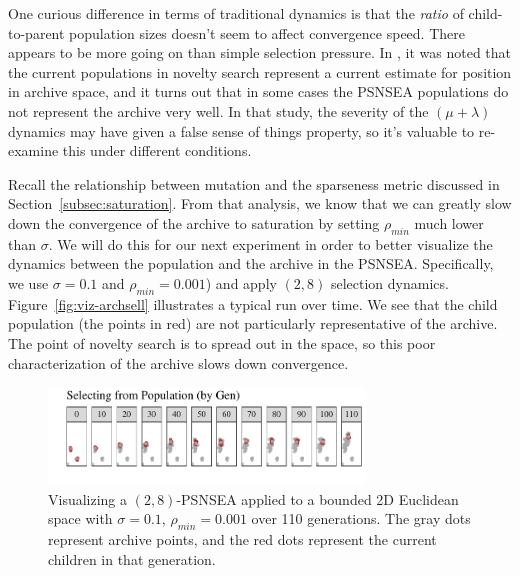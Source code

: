 \documentclass[twoside]{article}
\begin{document}
One curious difference in terms of traditional dynamics is that the \emph{ratio} of child-to-parent population sizes doesn't seem to affect convergence speed.  There appears to be more going on than simple selection pressure.  In \citet{Wiegand2021flairs}, it was noted that the current populations in novelty search represent a current estimate for position in archive space, and it turns out that in some cases the PSNSEA populations do not represent the archive very well.  In that study, the severity of the $(\mu+\lambda)$ dynamics may have given a false sense of things property, so it's valuable to re-examine this under different conditions.

Recall the relationship between mutation and the sparseness metric discussed in Section~\ref{subsec:saturation}.  From that analysis, we know that we can greatly slow down the convergence of the archive to saturation by setting $\rho_{min}$ much lower than $\sigma$.  We will do this for our next experiment in order to better visualize the dynamics between the population and the archive in the PSNSEA.  Specifically, we use $\sigma=0.1$ and $\rho_{min}=0.001$) and apply $(2,8)$ selection dynamics.  Figure~\ref{fig:viz-archsell} illustrates a typical run over time.  We see that the child population (the points in red) are not particularly representative of the archive.  The point of novelty search is to spread out in the space, so this poor characterization of the archive slows down convergence.
%
\begin{figure}[h]
  \center\includegraphics[width=0.75\textwidth]{Figures/viz-archive-and-pop-s01-r0001-mu16lam32-popsel.pdf}
  \caption{\label{fig:viz-popsel} Visualizing a $(2,8)$-PSNSEA applied to a bounded 2D Euclidean space with $\sigma=0.1$, $\rho_{min}=0.001$ over 110 generations.  The gray dots represent archive points, and the red dots represent the current children in that generation.}
\end{figure}
\end{document}
